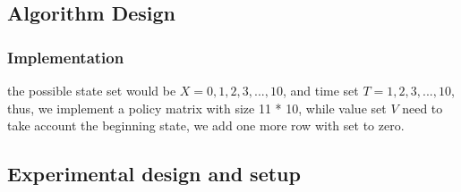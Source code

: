 \subsection{Algorithm Design}


\subsubsection{Implementation}
the possible state set would be $X = {0,1,2,3,...,10}$, and time set $T = {1,2,3,...,10}$, thus, we implement a policy matrix with size 11 * 10, while value set $V$ need to take account the beginning state, we add one more row with set to zero.


\subsection{Experimental design and setup}




